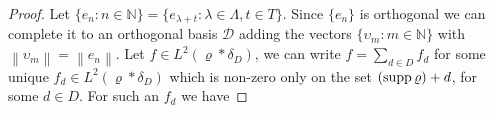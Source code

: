 \documentclass[reqno,a4paper,12pt]{amsart}
\numberwithin{equation}{section}
\newcommand{\N}{{\mathbb N}}
\newcommand{\Norm}[1]{{\left\|{#1}\right\|}}
\newcommand{\RR}{{\mathbb R}}
\newcommand{\CC}{{\mathbb C}}
\theoremstyle{remark}
\numberwithin{equation}{section}
\DeclareMathOperator\supp{\rm supp}
\def\N{\mathbb{N}}
\begin{document}
{\begin{proof}

Let $\{ e_{n}:n\in\N\}=\{e_{\lambda+t}:\lambda\in \Lambda,t\in T\}$. Since $\{ e_n\}$ is orthogonal we can complete it to an orthogonal basis $\mathcal{D}$ adding the vectors $\{ \upsilon_m:m\in \N\}$ with $\Norm{\upsilon_m}=\Norm{e_n}$.
Let $f\in L^2 (\varrho\ast{\delta}_D)$, we can write $f = \sum_{d\in D} f_d$ for some unique $f_d \in L^2(\varrho*{\delta}_D)$ which is non-zero only on the set $(\supp\varrho)+d$, for some $d\in D$. For such an $f_d$ we have


\end{proof}}
\end{document}

